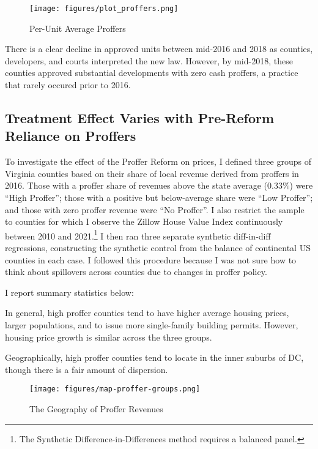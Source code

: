 \documentclass[12pt]{article}
\begin{document}
\begin{figure}[h]
    \caption{Per-Unit Average Proffers}
    \texttt{[image: figures/plot\_proffers.png]}
    \label{fig:plot_proffers}
\end{figure}

There is a clear decline in approved units between mid-2016 and 2018 as counties, developers, and courts interpreted the new law. However, by mid-2018, these counties approved substantial developments with zero cash proffers, a practice that rarely occured prior to 2016.

\subsection{Treatment Effect Varies with Pre-Reform Reliance on Proffers}
To investigate the effect of the Proffer Reform on prices, I defined three groups of Virginia counties based on their share of local revenue derived from proffers in 2016. Those with a proffer share of revenues above the state average (0.33\%) were ``High Proffer''; those with a positive but below-average share were ``Low Proffer''; and those with zero proffer revenue were ``No Proffer''. I also restrict the sample to counties for which I observe the Zillow House Value Index continuously between 2010 and 2021.\footnote{The Synthetic Difference-in-Differences method requires a balanced panel.} I then ran three separate synthetic diff-in-diff regressions, constructing the synthetic control from the balance of continental US counties in each case. I followed this procedure because I was not sure how to think about spillovers across counties due to changes in proffer policy.

I report summary statistics below:



In general, high proffer counties tend to have higher average housing prices, larger populations, and to issue more single-family building permits. However, housing price growth is similar across the three groups.

Geographically, high proffer counties tend to locate in the inner suburbs of DC, though there is a fair amount of dispersion.

\begin{figure}
    \centering
    \caption{The Geography of Proffer Revenues}
    \texttt{[image: figures/map-proffer-groups.png]}
\end{figure}
\end{document}
